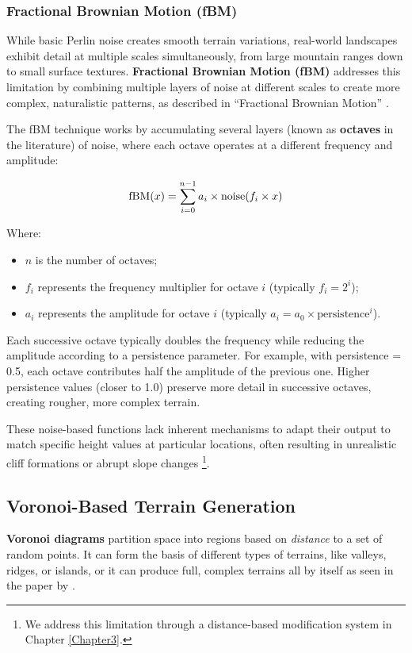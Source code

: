 \subsubsection{Fractional Brownian Motion (fBM)}

While basic Perlin noise creates smooth terrain variations, real-world landscapes exhibit detail at multiple scales simultaneously, from large mountain ranges down to small surface textures. \textbf{Fractional Brownian Motion (fBM)} addresses this limitation by combining multiple layers of noise at different scales to create more complex, naturalistic patterns, as described in ``Fractional Brownian Motion'' \citep{Inigo22}.

The fBM technique works by accumulating several layers (known as \textbf{octaves} in the literature) of noise, where each octave operates at a different frequency and amplitude:

\[\operatorname{fBM}(x) = \sum_{i=0}^{n-1} a_i \times \operatorname{noise}(f_i \times x)\]

Where:
\begin{itemize}
    \item $n$ is the number of octaves;
    \item $f_i$ represents the frequency multiplier for octave $i$ (typically $f_i = 2^i$);
    \item $a_i$ represents the amplitude for octave $i$ (typically $a_i = a_0 \times \text{persistence}^i$).
\end{itemize}

Each successive octave typically doubles the frequency while reducing the amplitude according to a persistence parameter. For example, with persistence = 0.5, each octave contributes half the amplitude of the previous one. Higher persistence values (closer to 1.0) preserve more detail in successive octaves, creating rougher, more complex terrain.

These noise-based functions lack inherent mechanisms to adapt their output to match specific height values at particular locations, often resulting in unrealistic cliff formations or abrupt slope changes \footnote{We address this limitation through a distance-based modification system in Chapter \ref{Chapter3}.}.

\subsection{Voronoi-Based Terrain Generation}
\label{voronoi_diagrams}

\textbf{Voronoi diagrams} partition space into regions based on \textit{distance} to a set of random points. It can form the basis of different types of terrains, like valleys, ridges, or islands, or it can produce full, complex terrains all by itself as seen in the paper  by \textcite{Olsen04}. 

